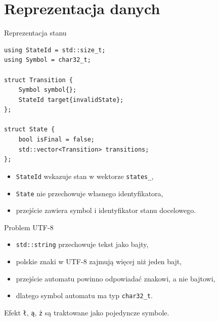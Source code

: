 \documentclass{beamer}
\begin{document}
\section{Reprezentacja danych}

\begin{frame}[fragile]{Reprezentacja stanu}
    \begin{verbatim}
using StateId = std::size_t;
using Symbol = char32_t;

struct Transition {
    Symbol symbol{};
    StateId target{invalidState};
};

struct State {
    bool isFinal = false;
    std::vector<Transition> transitions;
};
\end{verbatim}

    \begin{itemize}
        \item \texttt{StateId} wskazuje stan w wektorze \texttt{states\_},
        \item \texttt{State} nie przechowuje własnego identyfikatora,
        \item przejście zawiera symbol i identyfikator stanu docelowego.
    \end{itemize}
\end{frame}

\begin{frame}{Problem UTF-8}
    \begin{itemize}
        \item \texttt{std::string} przechowuje tekst jako bajty,
        \item polskie znaki w UTF-8 zajmują więcej niż jeden bajt,
        \item przejście automatu powinno odpowiadać znakowi, a nie bajtowi,
        \item dlatego symbol automatu ma typ \texttt{char32\_t}.
    \end{itemize}

    \vspace{0.3cm}

    \begin{block}{Efekt}
        \texttt{ł}, \texttt{ą}, \texttt{ż} są traktowane jako pojedyncze symbole.
    \end{block}
\end{frame}
\end{document}
